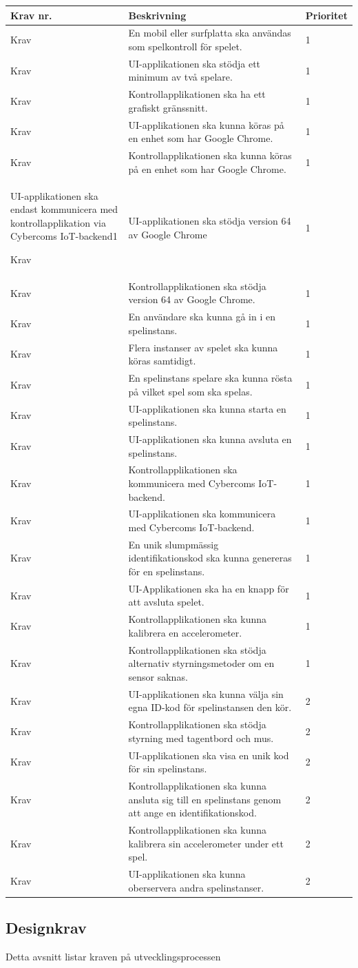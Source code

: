 \documentclass[10pt]{article}
\newcounter{indexcounter}
\newcommand{\Krav}[2]{
	\stepcounter{indexcounter}
	Krav \arabic{indexcounter} & #1 & #2 \\ \hline
}
\begin{document}
	\begin{tabular}{| p{2cm} | p{8cm} | p{2cm}|}
		\hline
		
		\textbf{Krav nr.} & \textbf{Beskrivning} &\textbf{Prioritet} \\ \hline
		\Krav{En mobil eller surfplatta ska användas som spelkontroll för spelet.}{1}
		\Krav{UI-applikationen ska stödja ett minimum av två spelare.}{1}
		\Krav{Kontrollapplikationen ska ha ett grafiskt gränssnitt.}{1}
		\Krav{UI-applikationen ska kunna köras på en enhet som har Google Chrome.}{1}
		\Krav{Kontrollapplikationen ska kunna köras på en enhet som har Google Chrome.}{1}
		\Krav{UI-applikationen ska endast kommunicera med \newline kontrollapplikation via  Cybercoms IoT-backend}{1}
		\Krav{UI-applikationen ska stödja version 64 av Google Chrome}{1}
		\Krav{Kontrollapplikationen ska stödja version 64 av Google Chrome.}{1}
		\Krav{En användare ska kunna gå in i en spelinstans.}{1}
		\Krav{Flera instanser av spelet ska kunna köras samtidigt.}{1}
		\Krav{En spelinstans spelare ska kunna rösta på vilket spel som ska spelas.}{1}
		\Krav{UI-applikationen ska kunna starta en spelinstans.}{1}
		\Krav{UI-applikationen ska kunna avsluta en spelinstans.}{1}
		\Krav{Kontrollapplikationen ska kommunicera med Cybercoms IoT-backend.}{1}
		\Krav{UI-applikationen ska kommunicera med Cybercoms IoT-backend.}{1}
		\Krav{En unik slumpmässig identifikationskod ska kunna genereras för en spelinstans.}{1}
		\Krav{UI-Applikationen ska ha en knapp för att avsluta spelet.}{1}
		\Krav{Kontrollapplikationen ska kunna kalibrera en accelerometer.}{1}
		\Krav{Kontrollapplikationen ska stödja alternativ styrningsmetoder om en sensor saknas.}{1}
		\Krav{UI-applikationen ska kunna välja sin egna ID-kod för spelinstansen den kör.}{2}
		\Krav{Kontrollapplikationen ska stödja styrning med tagentbord och mus.}{2}
		\Krav{UI-applikationen ska visa en unik kod för sin spelinstans.}{2}
		\Krav{Kontrollapplikationen ska kunna ansluta sig till en spelinstans genom att ange en identifikationskod.}{2}
		\Krav{Kontrollapplikationen ska kunna kalibrera sin accelerometer under ett spel.}{2}
		\Krav{UI-applikationen ska kunna oberservera andra spelinstanser.}{2}
						
	\end{tabular}
	
	\subsection{Designkrav}
	Detta avsnitt listar kraven på utvecklingsprocessen
	
\end{document}
